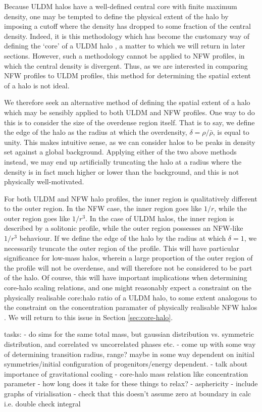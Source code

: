 \documentclass[a4paper,11pt]{article}
\begin{document}
Because ULDM halos have a well-defined central core with finite maximum density, one may be tempted to define the physical extent of the halo by imposing a cutoff where the density has dropped to some fraction of the central density. Indeed, it is this methodology which has become the customary way of defining the `core' of a ULDM halo \cite{e.g. bullock and Jens where state half density}, a matter to which we will return in later sections. However, such a methodology cannot be applied to NFW profiles, in which the central density is divergent. Thus, as we are interested in comparing NFW profiles to ULDM profiles, this method for determining the spatial extent of a halo is not ideal. 

We therefore seek an alternative method of defining the spatial extent of a halo which may be sensibly applied to both ULDM and NFW profiles. One way to do this is to consider the size of the overdense region itself. That is to say, we define the edge of the halo as the radius at which the overdensity, $\delta = \rho/\bar{\rho}$, is equal to unity. This makes intuitive sense, as we can consider halos to be peaks in density set against a global background. Applying either of the two above methods instead, we may end up artificially truncating the halo at a radius where the density is in fact much higher or lower than the background, and this is not physically well-motivated. 

For both ULDM and NFW halo profiles, the inner region is qualitatively different to the outer region. In the NFW case, the inner region goes like $1/r$, while the outer region goes like $1/r^3$. In the case of ULDM halos, the inner region is described by a solitonic profile, while the outer region possesses an NFW-like $1/r^3$ behaviour. If we define the edge of the halo by the radius at which $\delta = 1$, we necessarily truncate the outer region of the profile. This will have particular significance for low-mass halos, wherein a large proportion of the outer region of the profile will not be overdense, and will therefore not be considered to be part of the halo. Of course, this will have important implications when determining core-halo scaling relations, and one might reasonably expect a constraint on the physically realisable core:halo ratio of a ULDM halo, to some extent analogous to the constraint on the concentration paramater of physically realisable NFW halos \cite{NFW concentration}. We will return to this issue in Section \ref{sec:core-halo}.


tasks:
- do sims for the same total mass, but gaussian distribution vs. symmetric distribution, and correlated vs uncorrelated phases etc.
- come up with some way of determining transition radius, range? maybe in some way dependent on initial symmetries/initial configuration of progenitors/energy dependent.
- talk about importance of gravitational cooling
- core-halo mass relation like concentration parameter
- how long does it take for these things to relax?
- asphericity
- include graphs of virialisation - check that this doesn't assume zero at boundary in calc i.e. double check integral
\end{document}
